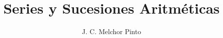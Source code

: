 \documentclass[12pt]{guia}
\title{Series y Sucesiones Aritméticas}
\author{J. C. Melchor Pinto}
\begin{document}
\pagestyle{headandfoot}
\addpoints
\INFO
\printanswers
\begin{questions}
    
    
    
    
    
    
    
    \begin{multicols}{2}
        
        
    \end{multicols}
    
    
    
    
\end{questions}

\end{document}

